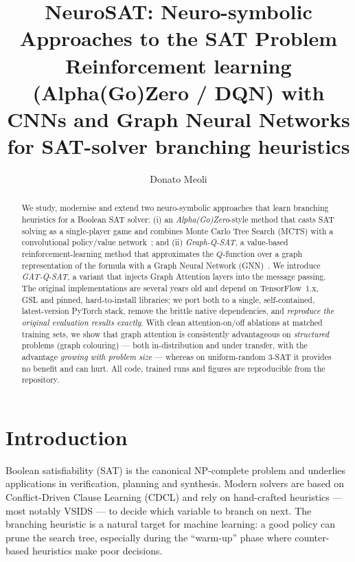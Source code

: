 \documentclass[11pt]{article}
\title{\textbf{NeuroSAT: Neuro-symbolic Approaches to the SAT Problem}\\[2mm]
\large Reinforcement learning (Alpha(Go)Zero / DQN) with CNNs and Graph Neural
Networks for SAT-solver branching heuristics}
\author{Donato Meoli}
\date{}
\begin{document}
\maketitle

\begin{abstract}
We study, modernise and extend two neuro-symbolic approaches that learn branching
heuristics for a Boolean SAT solver: (i) an \emph{Alpha(Go)Zero}-style method that
casts SAT solving as a single-player game and combines Monte Carlo Tree Search
(MCTS) with a convolutional policy/value network~\cite{wang2018}; and (ii)
\emph{Graph-Q-SAT}, a value-based reinforcement-learning method that approximates
the $Q$-function over a graph representation of the formula with a Graph Neural
Network (GNN)~\cite{kurin2020}. We introduce \emph{GAT-Q-SAT}, a variant that
injects Graph Attention layers into the message passing. The original
implementations are several years old and depend on TensorFlow~1.x, GSL and
pinned, hard-to-install libraries; we port both to a single, self-contained,
latest-version PyTorch stack, remove the brittle native dependencies, and
\emph{reproduce the original evaluation results exactly}. With clean
attention-on/off ablations at matched training sets, we show that graph attention
is consistently advantageous on \emph{structured} problems (graph colouring) ---
both in-distribution and under transfer, with the advantage \emph{growing with
problem size} --- whereas on uniform-random 3-SAT it provides no benefit and can
hurt. All code, trained runs and figures are reproducible from the repository.
\end{abstract}

\section{Introduction}
Boolean satisfiability (SAT) is the canonical NP-complete problem and underlies
applications in verification, planning and synthesis. Modern solvers are based on
Conflict-Driven Clause Learning (CDCL) and rely on hand-crafted heuristics --- most
notably VSIDS --- to decide which variable to branch on next. The branching
heuristic is a natural target for machine learning: a good policy can prune the
search tree, especially during the ``warm-up'' phase where counter-based
heuristics make poor decisions.
\end{document}
